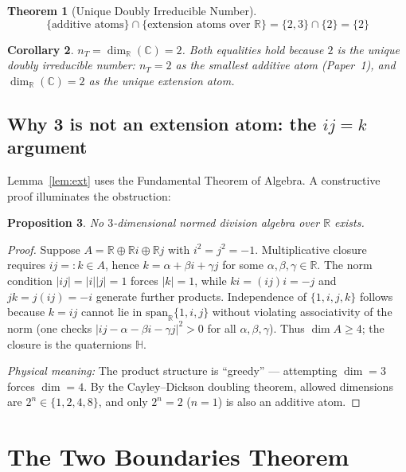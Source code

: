 \documentclass[12pt]{article}
\newtheorem{theorem}{Theorem}[section]
\newtheorem{corollary}[theorem]{Corollary}
\newtheorem{proposition}[theorem]{Proposition}
\theoremstyle{definition}
\theoremstyle{remark}
\newcommand{\CC}{\mathbb{C}}
\newcommand{\RR}{\mathbb{R}}
\newcommand{\HH}{\mathbb{H}}
\begin{document}
\begin{theorem}[Unique Doubly Irreducible Number]
\label{thm:doubly}
$$\{\text{additive atoms}\} \cap
  \{\text{extension atoms over } \RR\} = \{2,3\} \cap \{2\} = \{2\}$$
\end{theorem}

\begin{corollary}\label{cor:nT}
$n_T = \dim_\RR(\CC) = 2$.
Both equalities hold because $2$ is the unique doubly irreducible
number: $n_T = 2$ as the smallest additive atom (Paper~1), and
$\dim_\RR(\CC) = 2$ as the unique extension atom.
\end{corollary}

\subsection{Why 3 is not an extension atom: the $ij = k$ argument}

Lemma~\ref{lem:ext} uses the Fundamental Theorem of Algebra.
A constructive proof illuminates the obstruction:

\begin{proposition}\label{prop:ijk}
No $3$-dimensional normed division algebra over $\RR$ exists.
\end{proposition}
\begin{proof}
Suppose $A = \RR \oplus \RR i \oplus \RR j$ with
$i^2 = j^2 = -1$.
Multiplicative closure requires
$ij =: k \in A$, hence
$k = \alpha + \beta i + \gamma j$ for some
$\alpha, \beta, \gamma \in \RR$.
The norm condition $|ij| = |i||j| = 1$ forces $|k| = 1$,
while $ki = (ij)i = -j$ and $jk = j(ij) = -i$ generate
further products.
Independence of $\{1, i, j, k\}$ follows because
$k = ij$ cannot lie in $\mathrm{span}_\RR\{1, i, j\}$
without violating associativity of the norm
(one checks $|ij - \alpha - \beta i - \gamma j|^2 > 0$
for all $\alpha, \beta, \gamma$).
Thus $\dim A \geq 4$; the closure is the quaternions $\HH$.

\emph{Physical meaning:}
The product structure is ``greedy'' ---
attempting $\dim = 3$ forces $\dim = 4$.
By the Cayley--Dickson doubling theorem, allowed dimensions
are $2^n \in \{1, 2, 4, 8\}$, and only $2^n = 2$ ($n = 1$)
is also an additive atom.
\end{proof}

\section{The Two Boundaries Theorem}
\label{sec:boundaries}
\end{document}

